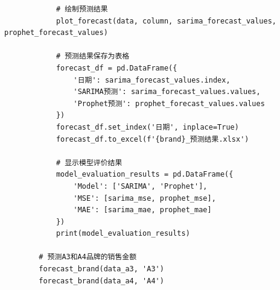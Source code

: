 \documentclass[a4paper]{article}
\begin{document}
\begin{lstlisting}
			# 绘制预测结果
			plot_forecast(data, column, sarima_forecast_values, prophet_forecast_values)
		
			# 预测结果保存为表格
			forecast_df = pd.DataFrame({
				'日期': sarima_forecast_values.index,
				'SARIMA预测': sarima_forecast_values.values,
				'Prophet预测': prophet_forecast_values.values
			})
			forecast_df.set_index('日期', inplace=True)
			forecast_df.to_excel(f'{brand}_预测结果.xlsx')
		
			# 显示模型评价结果
			model_evaluation_results = pd.DataFrame({
				'Model': ['SARIMA', 'Prophet'],
				'MSE': [sarima_mse, prophet_mse],
				'MAE': [sarima_mae, prophet_mae]
			})
			print(model_evaluation_results)
		
		# 预测A3和A4品牌的销售金额
		forecast_brand(data_a3, 'A3')
		forecast_brand(data_a4, 'A4')
		
	\end{lstlisting}
\end{document}
